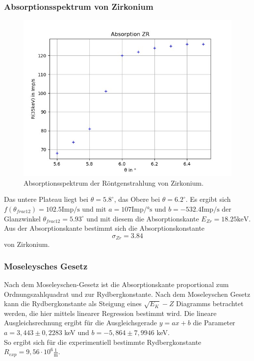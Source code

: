 \subsubsection*{Absorptionsspektrum von Zirkonium}
\begin{figure}[H]
  \centering
  \includegraphics{content/Zr.png}
  \caption{Absorptionsspektrum der Röntgenstrahlung von Zirkonium.}
  \label{fig:zr}
\end{figure}
Das untere Plateau liegt bei $\theta=5.8^\circ$, das Obere bei $\theta=6.2^\circ$. Es ergibt sich $f(\theta_{frac{1}{2}})=102.5 \textrm{Imp/s}$ und mit $a=107 \textrm{Imp/°s}$ und $b=-532.4 \textrm{Imp/s}$ der Glanzwinkel $\theta_{frac{1}{2}}=5.93^\circ$ und mit diesem die Absorptionskante $E_{Zr}=18.25 \textrm{keV}$. Aus der Absorptionskante bestimmt sich die Absorptionskonstante
\begin{equation*}
  \sigma_{Zr}=3.84
\end{equation*}
von Zirkonium.




\subsubsection*{Moseleysches Gesetz}
Nach dem Moseleyschen-Gesetz ist die Absorptionskante proportional zum Ordnungszahlquadrat und zur Rydbergkonstante. Nach dem Moseleyschen Gesetz kann die Rydbergkonstante als Steigung eines $\sqrt{E_{K}}-Z$ Diagramms betrachtet werden, die hier mittels linearer Regression bestimmt wird. 
Die lineare Ausgleichsrechnung ergibt für die Ausgleichsgerade $y = ax + b$ die Parameter $a = 3,443 \pm 0,2283$ keV und $b = -5,864 \pm 7,9946$ keV.\\
So ergibt sich für die experimentiell bestimmte Rydbergkonstante $R_{exp} = 9,56 \cdot 10^6 \mathrm{\frac{1}{m}}$. 

